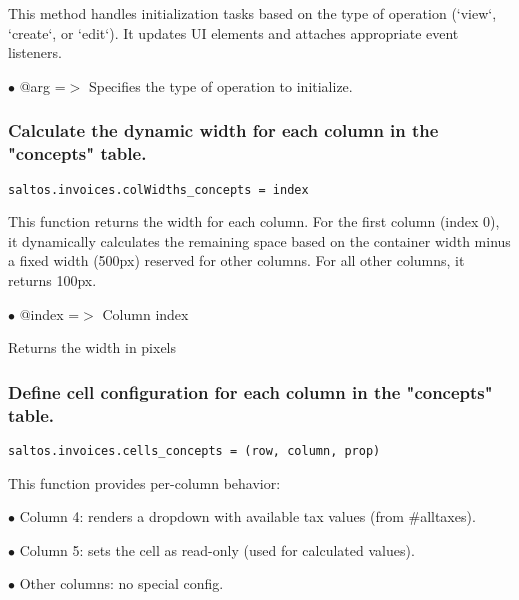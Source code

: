 \documentclass[a4paper]{article}
\begin{document}
This method handles initialization tasks based on the type of operation (`view`, `create`, or `edit`).
It updates UI elements and attaches appropriate event listeners.

\begin{compactitem}
\item[\color{myblue}$\bullet$] @arg =$>$ Specifies the type of operation to initialize.
\end{compactitem}

\hypertarget{toc147}{}
\subsubsection{Calculate the dynamic width for each column in the "concepts" table.}

\begin{lstlisting}
saltos.invoices.colWidths_concepts = index
\end{lstlisting}

This function returns the width for each column. For the first column (index 0),
it dynamically calculates the remaining space based on the container width minus
a fixed width (500px) reserved for other columns. For all other columns, it returns 100px.

\begin{compactitem}
\item[\color{myblue}$\bullet$] @index =$>$ Column index
\end{compactitem}

Returns the width in pixels

\hypertarget{toc148}{}
\subsubsection{Define cell configuration for each column in the "concepts" table.}

\begin{lstlisting}
saltos.invoices.cells_concepts = (row, column, prop)
\end{lstlisting}

This function provides per-column behavior:

\begin{compactitem}
\item[\color{myblue}$\bullet$] Column 4: renders a dropdown with available tax values (from \#alltaxes).
\item[\color{myblue}$\bullet$] Column 5: sets the cell as read-only (used for calculated values).
\item[\color{myblue}$\bullet$] Other columns: no special config.
\end{compactitem}
\end{document}
